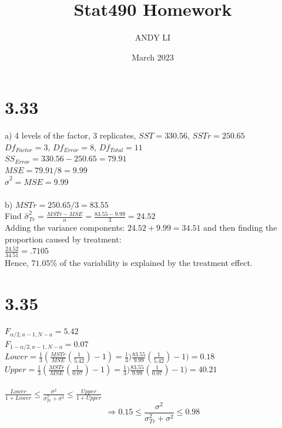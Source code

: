 \documentclass{article}
\title{Stat490 Homework}
\author{ANDY LI}
\date{March 2023}
\begin{document}
\maketitle
\section*{3.33}
a) 4 levels of the factor, 3 replicates, $SST = 330.56$, $SSTr = 250.65$
\\$Df_{Factor} = 3$, $Df_{Error} = 8$, $Df_{Total} = 11$
\\$SS_{Error} = 330.56 - 250.65 = 79.91$
\\$MSE = 79.91 / 8 = 9.99$ 
\\$\hat{\sigma}^2 = MSE = 9.99$
\\
\\b) $MSTr = 250.65 / 3 = 83.55$
\\Find $\hat{\sigma}^2_{Tr} = \frac{MSTr - MSE}{n} = \frac{83.55 - 9.99}{3} = 24.52$
\\Adding the variance components: $24.52 + 9.99 = 34.51$ and then finding the proportion caused by treatment:
\\$\frac{24.52}{34.51} = .7105$
\\Hence, $71.05\%$ of the variability is explained by the treatment effect.

\section*{3.35}
$F_{\alpha/2, a-1, N-a} = 5.42$
\\$F_{1-\alpha/2, a-1, N-a} = 0.07$
\\$Lower = \frac{1}{3}(\frac{MSTr}{MSE}(\frac{1}{5.42}) - 1) = \frac{1}{3})\frac{83.55}{9.99}(\frac{1}{5.42})-1) = 0.18$
\\$Upper = \frac{1}{3}(\frac{MSTr}{MSE}(\frac{1}{0.07}) - 1) = \frac{1}{3})\frac{83.55}{9.99}(\frac{1}{0.07})-1) = 40.21$
\\
\\$\frac{Lower}{1 + Lower} \leq \frac{\sigma^2}{\sigma_{Tr}^2 + \sigma^2} \leq \frac{Upper}{1 + Upper}$
\\$$\Rightarrow 0.15 \leq \frac{\sigma^2}{\sigma_{Tr}^2 + \sigma^2} \leq 0.98$$
\end{document}
